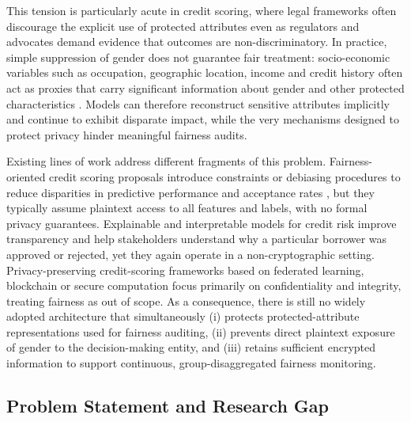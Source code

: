 \documentclass[a4paper,fleqn]{cas-dc}
\begin{document}
This tension is particularly acute in credit scoring, where legal frameworks often discourage the explicit use of protected attributes even as regulators and advocates demand evidence that outcomes are non-discriminatory. In practice, simple suppression of gender does not guarantee fair treatment: socio-economic variables such as occupation, geographic location, income and credit history often act as proxies that carry significant information about gender and other protected characteristics \cite{hassani2021societal, meshram2022transformative, lindholm2024fair}. Models can therefore reconstruct sensitive attributes implicitly and continue to exhibit disparate impact, while the very mechanisms designed to protect privacy hinder meaningful fairness audits.

Existing lines of work address different fragments of this problem. Fairness-oriented credit scoring proposals introduce constraints or debiasing procedures to reduce disparities in predictive performance and acceptance rates \cite{corrales2021review, moldovan2023algorithmic}, but they typically assume plaintext access to all features and labels, with no formal privacy guarantees. Explainable and interpretable models for credit risk \cite{zhu2023explainable, agarwal2021neural, ledent2025explainable} improve transparency and help stakeholders understand why a particular borrower was approved or rejected, yet they again operate in a non-cryptographic setting. Privacy-preserving credit-scoring frameworks based on federated learning, blockchain or secure computation \cite{Yang2022privacy, qiao2023pevachain, he2023privacy} focus primarily on confidentiality and integrity, treating fairness as out of scope. As a consequence, there is still no widely adopted architecture that simultaneously (i) protects protected-attribute representations used for fairness auditing, (ii) prevents direct plaintext exposure of gender to the decision-making entity, and (iii) retains sufficient encrypted information to support continuous, group-disaggregated fairness monitoring.

\subsection{Problem Statement and Research Gap}
\end{document}
